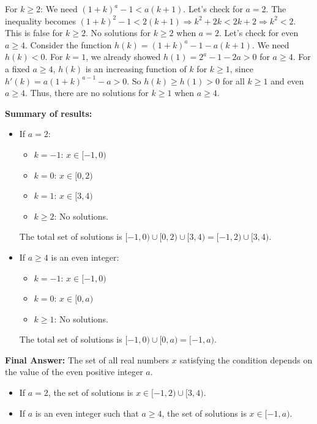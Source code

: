 \documentclass[12pt,a4paper]{article}
\theoremstyle{definition}
\begin{document}
        For $k \geq 2$: We need $(1+k)^a-1 < a(k+1)$.
        Let's check for $a=2$. The inequality becomes $(1+k)^2-1 < 2(k+1) \Rightarrow k^2+2k < 2k+2 \Rightarrow k^2<2$. This is false for $k \geq 2$. No solutions for $k \geq 2$ when $a=2$.
        Let's check for even $a \geq 4$. Consider the function $h(k) = (1+k)^a-1-a(k+1)$. We need $h(k)<0$.
        For $k=1$, we already showed $h(1)=2^a-1-2a > 0$ for $a \geq 4$.
        For a fixed $a \geq 4$, $h(k)$ is an increasing function of $k$ for $k \geq 1$, since $h'(k)=a(1+k)^{a-1}-a > 0$.
        So $h(k) \geq h(1) > 0$ for all $k \geq 1$ and even $a \geq 4$.
        Thus, there are no solutions for $k \geq 1$ when $a \geq 4$.

        \textbf{Summary of results:}
        \begin{itemize}
            \item If $a=2$:
            \begin{itemize}
                \item $k=-1$: $x \in [-1,0)$
                \item $k=0$: $x \in [0,2)$
                \item $k=1$: $x \in [3,4)$
                \item $k \geq 2$: No solutions.
            \end{itemize}
            The total set of solutions is $[-1,0) \cup [0,2) \cup [3,4) = [-1,2) \cup [3,4)$.

            \item If $a \geq 4$ is an even integer:
            \begin{itemize}
                \item $k=-1$: $x \in [-1,0)$
                \item $k=0$: $x \in [0,a)$
                \item $k \geq 1$: No solutions.
            \end{itemize}
            The total set of solutions is $[-1,0) \cup [0,a) = [-1,a)$.
        \end{itemize}

        \textbf{Final Answer:}
        The set of all real numbers $x$ satisfying the condition depends on the value of the even positive integer $a$.
        \begin{itemize}
            \item If $a=2$, the set of solutions is $x \in [-1, 2) \cup [3, 4)$.
            \item If $a$ is an even integer such that $a \geq 4$, the set of solutions is $x \in [-1, a)$.
        \end{itemize}
\end{document}
